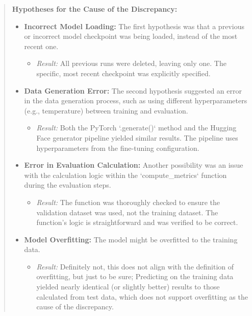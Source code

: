 \documentclass{article}
\begin{document}
\begin{quote}
\footnotesize{
\textbf{Hypotheses for the Cause of the Discrepancy:}
\begin{itemize}
    \item \textbf{Incorrect Model Loading:} The first hypothesis was that a previous or incorrect model checkpoint was being loaded, instead of the most recent one.
        \begin{itemize}
            \item \textit{Result:} All previous runs were deleted, leaving only one. The specific, most recent checkpoint was explicitly specified.
        \end{itemize}

    \item \textbf{Data Generation Error:} The second hypothesis suggested an error in the data generation process, such as using different hyperparameters (e.g., temperature) between training and evaluation.
        \begin{itemize}
            \item \textit{Result:} Both the PyTorch `.generate()` method and the Hugging Face generator pipeline yielded similar results. The pipeline uses hyperparameters from the fine-tuning configuration.
        \end{itemize}

    \item \textbf{Error in Evaluation Calculation:} Another possibility was an issue with the calculation logic within the `compute\_metrics` function during the evaluation steps.
        \begin{itemize}
            \item \textit{Result:} The function was thoroughly checked to ensure the validation dataset was used, not the training dataset. The function's logic is straightforward and was verified to be correct.
        \end{itemize}

    \item \textbf{Model Overfitting:} The model might be overfitted to the training data.
        \begin{itemize}
            \item \textit{Result:} Definitely not, this does not align with the definition of overfitting, but just to be sure; Predicting on the training data yielded nearly identical (or slightly better) results to those calculated from test data, which does not support overfitting as the cause of the discrepancy.
        \end{itemize}
    

\end{itemize}}
\end{quote}
\end{document}
